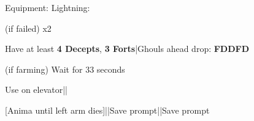 \begin{menu}
	\item Equipment: Lightning: 
\end{menu}

\begin{mainlist}
	\item {} (if failed)  x2\to{}
	\item Have at least \textbf{4 Decepts}, \textbf{3 Forts}|Ghouls ahead drop: \textbf{FDDFD}
	\item {} (if farming) Wait for 33 seconds
	\item Use  on elevator||\skip
	\item {} [Anima until left arm dies]\to{}||Save prompt||Save prompt
\end{mainlist}
